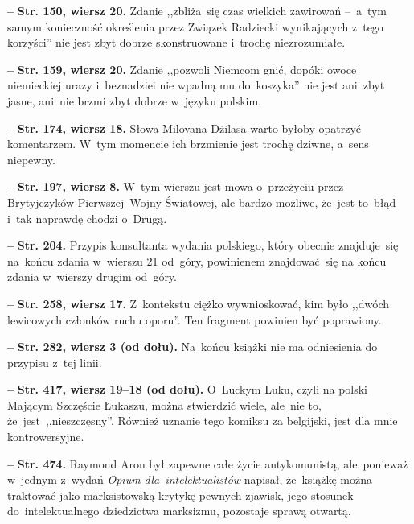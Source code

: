 \documentclass[a4paper,11pt]{article}
\newcommand{\spaceFour}{0.5em}
\newcommand{\tb}{\textbf}
\newcommand{\noi}{\noindent}
\newcommand{\start}{\noi \tb{--} {}}
\newcommand{\Str}[1]{\tb{Str. #1.}}
\newcommand{\StrWg}[2]{\tb{Str. #1, wiersz #2.}}
\newcommand{\StrWd}[2]{\tb{Str. #1, wiersz #2 (od dołu).}}
\begin{document}
\start \StrWg{150}{20} Zdanie ,,zbliża~się czas wielkich zawirowań
--~a~tym samym konieczność określenia przez Związek Radziecki
wynikających z~tego korzyści'' nie jest zbyt dobrze skonstruowane
i~trochę niezrozumiałe.

\vspace{\spaceFour}


\start \StrWg{159}{20} Zdanie ,,pozwoli Niemcom gnić, dopóki owoce
niemieckiej urazy i~beznadziei nie wpadną mu do~koszyka'' nie jest
ani~zbyt jasne, ani~nie brzmi zbyt dobrze w~języku polskim.

\vspace{\spaceFour}


\start \StrWg{174}{18} Słowa Milovana Dżilasa warto byłoby opatrzyć
komentarzem. W~tym momencie ich brzmienie jest trochę dziwne, a~sens
niepewny.

\vspace{\spaceFour}


\start \StrWg{197}{8} W~tym wierszu jest mowa o~przeżyciu przez
Brytyjczyków Pierwszej~Wojny Światowej, ale bardzo możliwe, że~jest
to~błąd i~tak naprawdę chodzi o~Drugą.

\vspace{\spaceFour}


\start \Str{204} Przypis konsultanta wydania polskiego, który obecnie
znajduje~się na~końcu zdania w~wierszu 21 od~góry, powinienem
znajdować~się na końcu zdania w~wierszy drugim od~góry.

\vspace{\spaceFour}


\start \StrWg{258}{17} Z~kontekstu ciężko wywnioskować, kim było
,,dwóch lewicowych członków ruchu oporu''. Ten fragment powinien być
poprawiony.

\vspace{\spaceFour}


\start \StrWd{282}{3} Na~końcu książki nie ma odniesienia do przypisu
z~tej linii.

\vspace{\spaceFour}


\start \StrWd{417}{19--18} O~Luckym Luku, czyli na polski Mającym
Szczęście Łukaszu, można stwierdzić wiele, ale~nie to,
że~jest~,,nieszczęsny''. Również uznanie tego komiksu za belgijski,
jest dla mnie kontrowersyjne.

\vspace{\spaceFour}


\start \Str{474} Raymond Aron był zapewne całe życie antykomunistą,
ale~ponieważ w~jednym z~wydań \emph{Opium dla~intelektualistów}
napisał, że~książkę można traktować jako marksistowską krytykę pewnych
zjawisk, jego stosunek do~intelektualnego dziedzictwa marksizmu,
pozostaje sprawą otwartą.
\end{document}

